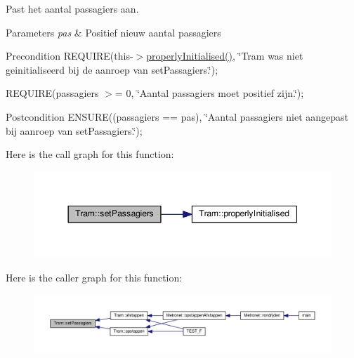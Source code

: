 Past het aantal passagiers aan. 


\begin{DoxyParams}{Parameters}
{\em pas} & Positief nieuw aantal passagiers \\
\hline
\end{DoxyParams}
\begin{DoxyPrecond}{Precondition}
R\+E\+Q\+U\+I\+RE(this-\/$>$\hyperlink{class_tram_ac2688f590e4db232b4f535c9bf959efb}{properly\+Initialised()}, \char`\"{}\+Tram was niet geinitialiseerd bij de aanroep van set\+Passagiers.\char`\"{}); 

R\+E\+Q\+U\+I\+RE(passagiers $>$= 0, \char`\"{}\+Aantal passagiers moet positief zijn.\char`\"{}); 
\end{DoxyPrecond}
\begin{DoxyPostcond}{Postcondition}
E\+N\+S\+U\+RE((passagiers == pas), \char`\"{}\+Aantal passagiers niet aangepast bij aanroep van set\+Passagiers.\char`\"{}); 
\end{DoxyPostcond}
Here is the call graph for this function\+:\nopagebreak
\begin{figure}[H]
\begin{center}
\leavevmode
\includegraphics[width=344pt]{class_tram_a3454b4b012930b02eff8fd22b7d9428a_cgraph}
\end{center}
\end{figure}
Here is the caller graph for this function\+:\nopagebreak
\begin{figure}[H]
\begin{center}
\leavevmode
\includegraphics[width=350pt]{class_tram_a3454b4b012930b02eff8fd22b7d9428a_icgraph}
\end{center}
\end{figure}
\mbox{\label{class_tram_a8d55296c7ede4aa92c9b3a4b2a9495a8}} 
